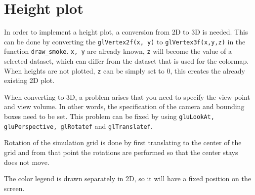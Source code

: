 \section{Height plot}
In order to implement a height plot, a conversion from 2D to 3D is needed.
This can be done by converting the \texttt{glVertex2f(x, y)} to \texttt{glVertex3f(x,y,z)} in the function \texttt{draw\_smoke}.
\texttt{x, y} are already known, \texttt{z} will become the value of a selected dataset, which can differ from the dataset that is used for the colormap.
When heights are not plotted, \texttt{z} can be simply set to 0, this creates the already existing 2D plot.

When converting to 3D, a problem arises that you need to specify the view point and view volume.
In other words, the specification of the camera and bounding boxes need to be set.
This problem can be fixed by using \texttt{gluLookAt, gluPerspective, glRotatef} and \texttt{glTranslatef}.

Rotation of the simulation grid is done by first translating to the center of the grid and from that point the rotations are performed so that the center stays does not move.

The color legend is drawn separately in 2D, so it will have a fixed position on the screen.
